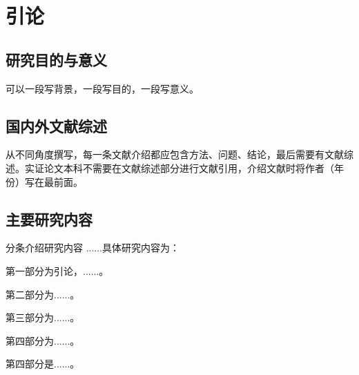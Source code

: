 \chapter*{引\hspace{1em}论}
{}
\section{研究目的与意义}
可以一段写背景，一段写目的，一段写意义。

\section{国内外文献综述}
从不同角度撰写，每一条文献介绍都应包含方法、问题、结论，最后需要有文献综述。实证论文本科不需要在文献综述部分进行文献引用，介绍文献时将作者（年份）写在最前面。

\section{主要研究内容}
分条介绍研究内容
......具体研究内容为：

第一部分为引论，......。

第二部分为......。

第三部分为......。

第四部分为......。

第四部分是......。